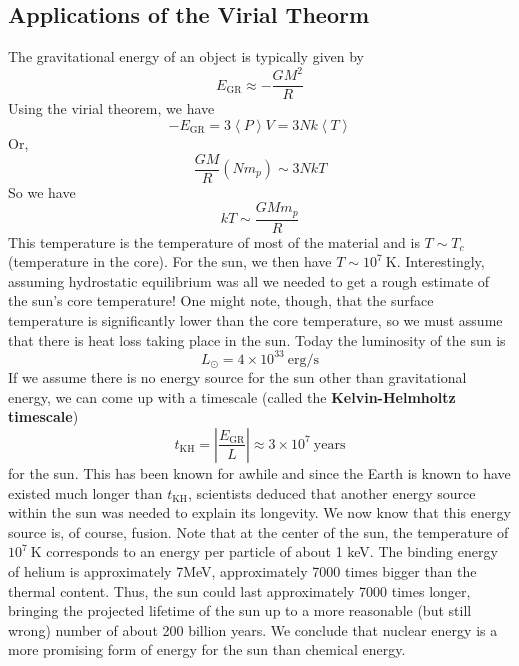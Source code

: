 \documentclass[10pt]{article}
\numberwithin{equation}{section}
\newcommand{\norm}[1]{\left\lvert#1\right\rvert}
\newcommand{\avg}[1]{\left\langle#1\right\rangle}
\begin{document}
	\subsection{Applications of the Virial Theorm}
	The gravitational energy of an object is typically given by
	\begin{equation}
		\label{avt.1}E_{\mathrm{GR}}\approx -\frac{GM^2}{R}
	\end{equation}
	Using the virial theorem, we have
	\begin{equation}
		\label{avt.2} -E_{\mathrm{GR}}=3\avg{P}V=3Nk\avg{T}
	\end{equation}
	Or,
	\begin{equation}
		\label{avt.3} \frac{GM}{R}\left(Nm_p\right)\sim 3NkT
	\end{equation}
	So we have
	\begin{equation}
		\label{avt.4} \boxed{kT\sim \frac{GMm_p}{R}}
	\end{equation}
	This temperature is the temperature of most of the material
        and is $T\sim T_c$ (temperature in the core). For the sun, we
        then have $T\sim 10^7\ \mathrm{K}$. Interestingly, assuming
        hydrostatic equilibrium was all we needed to get a rough
        estimate of the sun's core temperature! One might note,
        though, that the surface temperature is significantly lower
        than the core temperature, so we must assume that there is
        heat loss taking place in the sun. Today the luminosity of the
        sun is
	\begin{equation}
		\label{avt.5} L_\odot = 4\times 10^{33}\ \mathrm{erg/s}
	\end{equation}
	If we assume there is no energy source for the sun other than gravitational energy, we can come up with a timescale (called the \textbf{Kelvin-Helmholtz timescale})
	\begin{equation}
		\label{avt.6} t_{\mathrm{KH}}=\norm{\frac{E_{\mathrm{GR}}}{L}}\approx 3\times 10^7\ \mathrm{years}
	\end{equation}
	for the sun. This has been known for awhile and since the Earth is known to have existed much longer than $t_{\mathrm{KH}}$, scientists deduced that another energy source within the sun was needed to explain its longevity. We now know that this energy source is, of course, fusion. Note that at the center of the sun, the temperature of $10^7\ \mathrm{K}$ corresponds to an energy per particle of about 1 keV. The binding energy of helium is approximately 7MeV, approximately 7000 times bigger than the thermal content. Thus, the sun could last approximately 7000 times longer, bringing the projected lifetime of the sun up to a more reasonable (but still wrong) number of about 200 billion years. We conclude that nuclear energy is a more promising form of energy for the sun than chemical energy.\\
	
\end{document}
